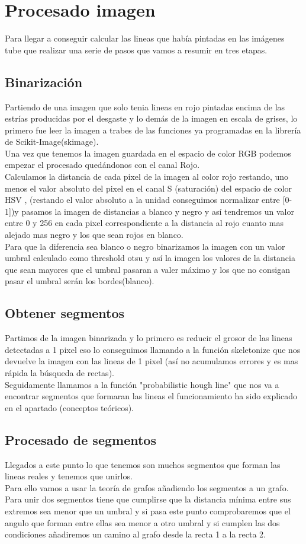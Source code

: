 \section{Procesado imagen}
Para llegar a conseguir calcular las lineas que había pintadas en las imágenes tube que realizar una serie de pasos que vamos a resumir en tres etapas.
\subsection{Binarización}
Partiendo de una imagen que solo tenia lineas en rojo pintadas encima de las estrías producidas por el desgaste y lo demás de la imagen en escala de grises, lo primero fue leer la imagen a trabes de las funciones ya programadas en la librería de Scikit-Image(skimage).\\
Una vez que tenemos la imagen guardada en el espacio de color RGB podemos empezar el procesado quedándonos con el canal Rojo.\\
Calculamos la distancia de cada pixel de la imagen al color rojo restando, uno menos el valor absoluto del pixel en el canal S (saturación) del espacio de color HSV , (restando el valor absoluto a la unidad conseguimos normalizar entre [0-1])y pasamos la imagen de distancias a blanco y negro y así tendremos un valor entre 0 y 256 en cada pixel correspondiente a la distancia al rojo cuanto mas alejado mas negro y los que sean rojos en blanco.\\
Para que la diferencia sea blanco o negro binarizamos la imagen con un valor umbral calculado como threshold otsu y así la imagen los valores de la distancia que sean mayores que el umbral pasaran a valer máximo y los que no consigan pasar el umbral serán los bordes(blanco).

\subsection{Obtener segmentos}
Partimos de la imagen binarizada y lo primero es reducir el grosor de las lineas detectadas a 1 pixel eso lo conseguimos llamando a la función skeletonize que nos devuelve la imagen con las lineas de 1 pixel (así no acumulamos errores y es mas rápida la búsqueda de rectas).\\
Seguidamente llamamos a la función "probabilistic hough line" que nos va a encontrar segmentos que formaran las lineas el funcionamiento ha sido explicado en el apartado (conceptos teóricos).

\subsection{Procesado de segmentos}
Llegados a este punto lo que tenemos son muchos segmentos que forman las lineas reales y tenemos que unirlos.\\
Para ello vamos a usar la teoría de grafos añadiendo los segmentos a un grafo.\\
Para unir dos segmentos tiene que cumplirse que la distancia mínima entre sus extremos sea menor que un umbral y si pasa este punto comprobaremos que el angulo que forman entre ellas sea menor a otro umbral y si cumplen las dos condiciones añadiremos un camino al grafo desde la recta 1 a la recta 2.
